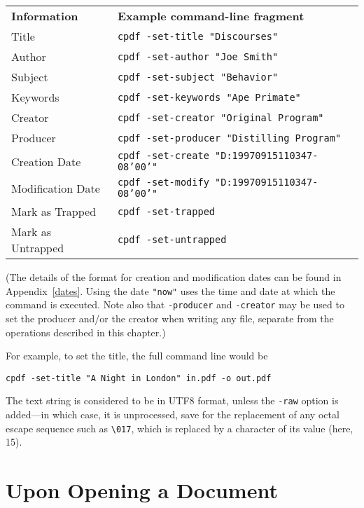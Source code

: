 \documentclass{book}
\begin{document}
{\small\begin{framed}
    \noindent\begin{tabular}{ll}
       \textbf{Information} & \textbf{Example command-line fragment} \\
       Title & \texttt{cpdf -set-title "Discourses"} \\
       Author & \texttt{cpdf -set-author "Joe Smith"} \\
       Subject & \texttt{cpdf -set-subject "Behavior"} \\
       Keywords & \texttt{cpdf -set-keywords "Ape Primate"} \\
       Creator & \texttt{cpdf -set-creator "Original Program"} \\
       Producer & \texttt{cpdf -set-producer "Distilling Program"} \\
       Creation Date & \texttt{cpdf -set-create "D:19970915110347-08'00'"} \\
       Modification Date & \texttt{cpdf -set-modify "D:19970915110347-08'00'"} \\
       Mark as Trapped & \texttt{cpdf -set-trapped} \\
       Mark as Untrapped & \texttt{cpdf -set-untrapped} \\
    \end{tabular}
\end{framed}}

  \noindent (The details of the format for creation and modification dates can be found
in Appendix~\ref{dates}. Using the date \texttt{"now"} uses the time and date
at which the command is executed. Note also that \texttt{-producer} and \texttt{-creator} may be used to set the producer and/or the creator when writing any file, separate from the operations described in this chapter.)
  
  \vspace{2mm}
  For example, to set the title, the full command line would be
  \begin{framed}
    \small\verb!cpdf -set-title "A Night in London" in.pdf -o out.pdf!
  \end{framed}
\noindent The text string is considered to be in UTF8 format, unless the \texttt{-raw}
option is added---in which case, it is unprocessed, save for the replacement of any octal escape sequence such as \texttt{\textbackslash 017}, which is replaced by a character of its value (here, 15).

\section{Upon Opening a Document}
\end{document}
